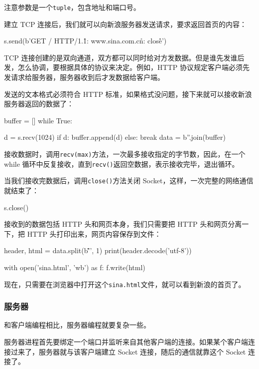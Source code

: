 注意参数是一个\texttt{tuple}，包含地址和端口号。

建立 TCP 连接后，我们就可以向新浪服务器发送请求，要求返回首页的内容：

\begin{pythoncode}
s.send(b'GET / HTTP/1.1\r\nHost: www.sina.com.cn\r\nConnection: close\r\n\r\n')
\end{pythoncode}

TCP
连接创建的是双向通道，双方都可以同时给对方发数据。但是谁先发谁后发，怎么协调，要根据具体的协议来决定。例如，HTTP
协议规定客户端必须先发请求给服务器，服务器收到后才发数据给客户端。

发送的文本格式必须符合 HTTP
标准，如果格式没问题，接下来就可以接收新浪服务器返回的数据了：

\begin{pythoncode}
buffer = []
while True:
    
    d = s.recv(1024)
    if d:
        buffer.append(d)
    else:
        break
data = b''.join(buffer)
\end{pythoncode}

接收数据时，调用\texttt{recv(max)}方法，一次最多接收指定的字节数，因此，在一个
while
循环中反复接收，直到\texttt{recv()}返回空数据，表示接收完毕，退出循环。

当我们接收完数据后，调用\texttt{close()}方法关闭
Socket，这样，一次完整的网络通信就结束了：

\begin{pythoncode}
s.close()
\end{pythoncode}

接收到的数据包括 HTTP 头和网页本身，我们只需要把 HTTP
头和网页分离一下，把 HTTP 头打印出来，网页内容保存到文件：

\begin{pythoncode}
header, html = data.split(b'\r\n\r\n', 1)
print(header.decode('utf-8'))

with open('sina.html', 'wb') as f:
    f.write(html)
\end{pythoncode}

现在，只需要在浏览器中打开这个\texttt{sina.html}文件，就可以看到新浪的首页了。

\hypertarget{ux670dux52a1ux5668}{%
\subsubsection{服务器}\label{ux670dux52a1ux5668}}

和客户端编程相比，服务器编程就要复杂一些。

服务器进程首先要绑定一个端口并监听来自其他客户端的连接。如果某个客户端连接过来了，服务器就与该客户端建立
Socket 连接，随后的通信就靠这个 Socket 连接了。


